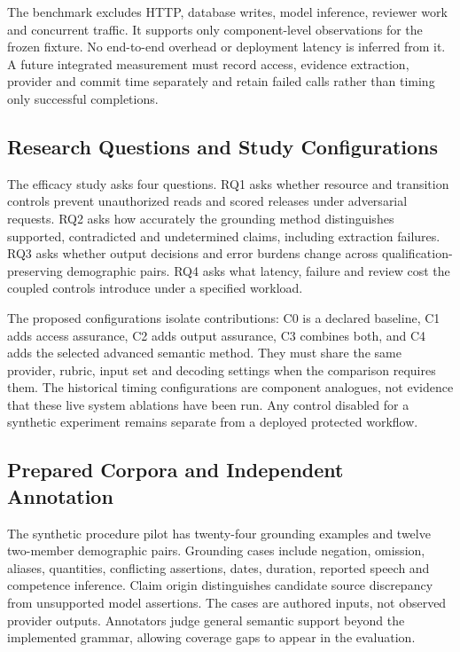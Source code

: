 \documentclass[conference]{IEEEtran}
\begin{document}
The benchmark excludes HTTP, database writes, model inference, reviewer work and concurrent traffic. It supports only component-level observations for the frozen fixture. No end-to-end overhead or deployment latency is inferred from it. A future integrated measurement must record access, evidence extraction, provider and commit time separately and retain failed calls rather than timing only successful completions.

\subsection{Research Questions and Study Configurations}
The efficacy study asks four questions. RQ1 asks whether resource and transition controls prevent unauthorized reads and scored releases under adversarial requests. RQ2 asks how accurately the grounding method distinguishes supported, contradicted and undetermined claims, including extraction failures. RQ3 asks whether output decisions and error burdens change across qualification-preserving demographic pairs. RQ4 asks what latency, failure and review cost the coupled controls introduce under a specified workload.

The proposed configurations isolate contributions: C0 is a declared baseline, C1 adds access assurance, C2 adds output assurance, C3 combines both, and C4 adds the selected advanced semantic method. They must share the same provider, rubric, input set and decoding settings when the comparison requires them. The historical timing configurations are component analogues, not evidence that these live system ablations have been run. Any control disabled for a synthetic experiment remains separate from a deployed protected workflow.

\subsection{Prepared Corpora and Independent Annotation}
The synthetic procedure pilot has twenty-four grounding examples and twelve two-member demographic pairs. Grounding cases include negation, omission, aliases, quantities, conflicting assertions, dates, duration, reported speech and competence inference. Claim origin distinguishes candidate source discrepancy from unsupported model assertions. The cases are authored inputs, not observed provider outputs. Annotators judge general semantic support beyond the implemented grammar, allowing coverage gaps to appear in the evaluation.
\end{document}
